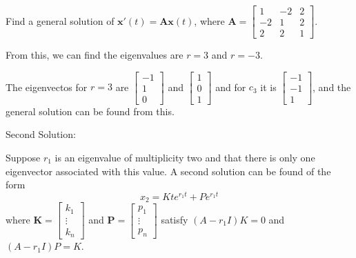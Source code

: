 \documentclass[../diffeq.tex]{subfiles}
\begin{document}
\begin{example}
    Find a general solution of $\textbf{x}'(t)=\textbf{Ax}(t)$, where $\textbf{A}=\begin{bmatrix}
        1 & -2 & 2\\
        -2 & 1 & 2\\
        2 & 2 & 1
    \end{bmatrix}$.

    From this, we can find the eigenvalues are $r=3$ and $r=-3$.

    The eigenvectos for $r=3$ are $\begin{bmatrix}
        -1\\1\\0
    \end{bmatrix}$ and $\begin{bmatrix}
        1\\0\\1
    \end{bmatrix}$ and for $c_3$ it is $\begin{bmatrix}
        -1\\-1\\1
    \end{bmatrix}$, and the general solution can be found from this.
\end{example}

Second Solution:

Suppose $r_1$ is an eigenvalue of multiplicity two and that there is only one eigenvector associated with this value. A second solution can be found of the form 
\[ x_2=Kte^{r_1t}+Pe^{r_1t} \]
where $\textbf{K}=\begin{bmatrix}
    k_1 \\ \vdots \\ k_n
\end{bmatrix}$ and $\textbf{P}=\begin{bmatrix}
    p_1 \\ \vdots \\ p_n
\end{bmatrix}$ satisfy $(A-r_1I)K=0$ and $(A-r_1I)P=K$.
\end{document}
